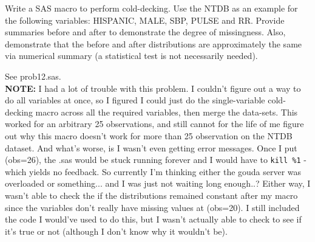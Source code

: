 \documentclass[12pt,answers]{exam}
\begin{document}
\begin{questions}

\pagebreak 
\question Write a SAS macro to perform cold-decking.  Use the NTDB as
an example for the following variables: HISPANIC, MALE, SBP, PULSE and
RR.  Provide summaries before and after to demonstrate the degree
of missingness.  Also, demonstrate that the before and after
distributions are approximately the same via numerical summary (a
statistical test is not necessarily needed).

\begin{solution}
See prob12.sas. \\ \textbf{NOTE:} I had a lot of trouble with this problem. I couldn't figure out a way to do all variables at once, so I figured I could just do the single-variable cold-decking macro across all the required variables, then merge the data-sets. This worked for an arbitrary 25 observations, and still cannot for the life of me figure out why this macro doesn't work for more than 25 observation on the NTDB dataset. And what's worse, is I wasn't even getting error messages. Once I put (obs=26), the .sas would be stuck running forever and I would have to \texttt{kill \%1} - which yields no feedback. So currently I'm thinking either the gouda server was overloaded or something... and I was just not waiting long enough..? Either way, I wasn't able to check the if the distributions remained constant after my macro since the variables don't really have missing values at (obs=20). I still included the code I would've used to do this, but I wasn't actually able to check to see if it's true or not (although I don't know why it wouldn't be). 
\end{solution}


\end{questions}
\end{document}
